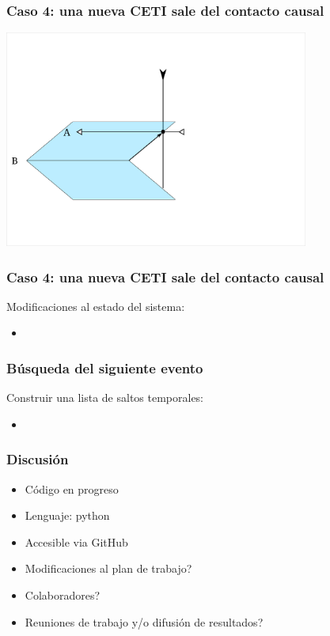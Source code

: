 \documentclass[handout]{beamer}
\theoremstyle{plain}
\theoremstyle{definition}
\theoremstyle{remark}
\begin{document}
\begin{frame}\frametitle{Caso 4: una nueva CETI sale del contacto causal}
   \centering
   \includegraphics[width=0.75\textwidth]{C5.png}
\end{frame}  %

\begin{frame}\frametitle{Caso 4: una nueva CETI sale del contacto causal}

   Modificaciones al estado del sistema:
   \begin{itemize}
      \item 
   \end{itemize}

\end{frame}  %

\begin{frame}\frametitle{Búsqueda del siguiente evento}

   Construir una lista de saltos temporales:

   \begin{itemize}
      \item 
   \end{itemize}

\end{frame}  %
 
\begin{frame}\frametitle{Discusión}
   \begin{itemize}
      \item Código en progreso
      \item Lenguaje: python
      \item Accesible via GitHub
      \item Modificaciones al plan de trabajo?
      \item Colaboradores?
      \item Reuniones de trabajo y/o difusión de resultados?
   \end{itemize}
\end{frame}%
\end{document}

